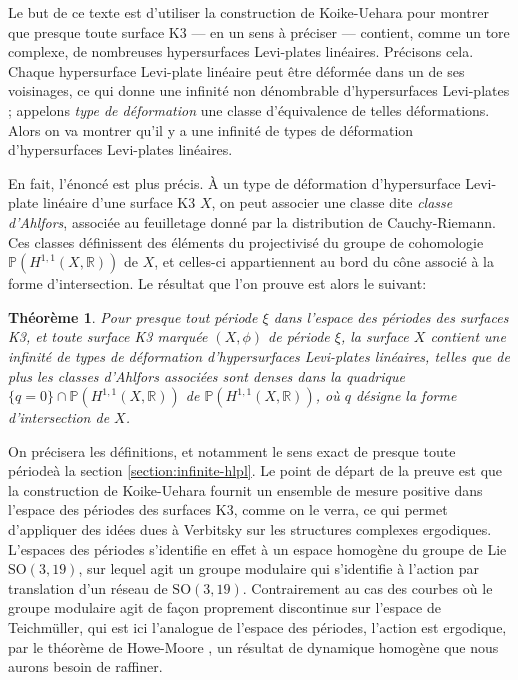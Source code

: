 \documentclass[JEP,XML,SOM,Unicode,francais,published]{cedram}
\newcommand{\R}{\mathbb{R}}
\newcommand{\SO}{\mathrm{SO}}
\newtheorem{thm}{Théorème}
\theoremstyle{definition}
\begin{document}
Le but de ce texte est d'utiliser la construction de Koike-Uehara pour montrer que presque toute surface K3 — en un sens à préciser — contient, comme un tore complexe, de nombreuses hypersurfaces Levi-plates linéaires. Précisons cela. Chaque hypersurface Levi-plate linéaire peut être déformée dans un de ses voisinages, ce qui donne une infinité non dénombrable d'hypersurfaces Levi-plates ; appelons \emph{type de déformation} une classe d'équivalence de telles déformations. Alors on va montrer qu'il y a une infinité de types de déformation d'hypersurfaces Levi-plates linéaires.

En fait, l'énoncé est plus précis. À un type de déformation d'hypersurface Levi-plate linéaire d'une surface K3 $X$, on peut associer une classe dite \emph{classe d'Ahlfors}, associée au feuilletage donné par la distribution de Cauchy-Riemann. Ces classes définissent des éléments du projectivisé du groupe de cohomologie $\mathbb{P}\left(H^{1, 1}(X, \R)\right)$ de $X$, et celles-ci appartiennent au bord du cône associé à la forme d'intersection. Le résultat que l'on prouve est alors le suivant:

\begin{thm}\label{coro-ahlfors}Pour presque tout période $\xi$ dans l'espace des périodes des surfaces K3, et toute surface K3 marquée $(X, \phi)$ de période $\xi$, la surface $X$ contient une infinité de types de déformation d'hypersurfaces Levi-plates linéaires, telles que de plus les classes d'Ahlfors associées sont denses dans la quadrique $\{q = 0\} \cap \mathbb{P}(H^{1, 1}(X, \R))$ de $\mathbb{P}(H^{1, 1}(X, \R))$, où $q$ désigne la forme d'intersection de $X$.
\end{thm}

On précisera les définitions, et notamment le sens exact de \og presque toute période\fg à la section \ref{section:infinite-hlpl}. Le point de départ de la preuve est que la construction de Koike-Uehara fournit un ensemble de mesure positive dans l'espace des périodes des surfaces K3, comme on le verra, ce qui permet d'appliquer des idées dues à Verbitsky \cite{verbitsky2015ergodic} sur les structures complexes ergodiques. L'espaces des périodes s'identifie en effet à un espace homogène du groupe de Lie $\SO(3, 19)$, sur lequel agit un groupe modulaire qui s'identifie à l'action par translation d'un réseau de $\SO(3, 19)$. Contrairement au cas des courbes où le groupe modulaire agit de façon proprement discontinue sur l'espace de Teichmüller, qui est ici l'analogue de l'espace des périodes, l'action est ergodique, par le théorème de Howe-Moore \cite{zimmer2013ergodic}, un résultat de dynamique homogène que nous aurons besoin de raffiner.
\end{document}
